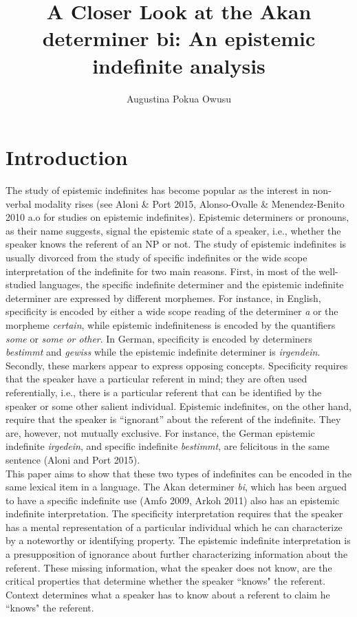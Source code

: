 \documentclass[output=paper,
modfonts
]{langsci/langscibook}
\title{A Closer Look at the Akan determiner bi: An epistemic indefinite analysis}
\author{%
 Augustina Pokua Owusu\affiliation{Rutgers University }
}
\begin{document}
\maketitle

\section{Introduction} 
The study of epistemic indefinites has become popular as the interest in non-verbal modality rises (see Aloni \& Port 2015, Alonso-Ovalle \& Menendez-Benito 2010 a.o for studies on epistemic indefinites). Epistemic determiners or pronouns, as their name suggests, signal the epistemic state of a speaker, i.e., whether the speaker knows the referent of an NP or not. The study of epistemic indefinites is usually divorced from the study of specific indefinites or the wide scope interpretation of the indefinite for two main reasons. First, in most of the well-studied languages, the specific indefinite determiner and the epistemic indefinite determiner are expressed by different morphemes. For instance, in English, specificity is encoded by either a wide scope reading of the determiner \emph{a} or the morpheme \emph{certain}, while epistemic indefiniteness is encoded by the quantifiers \emph{some} or \emph{some or other}. In German, specificity is encoded by determiners \emph{bestimmt} and \emph{gewiss} while the epistemic indefinite determiner is \emph{irgendein}. Secondly, these markers appear to express opposing concepts. Specificity requires that the speaker have a particular referent in mind; they are often used referentially, i.e., there is a particular referent that can be identified by the speaker or some other salient individual. Epistemic indefinites, on the other hand, require that the speaker is ``ignorant'' about the referent of the indefinite. They are, however, not mutually exclusive. For instance, the German epistemic indefinite \emph{irgedein}, and specific indefinite \emph{bestimmt}, are felicitous in the same sentence (Aloni and Port 2015).  \\
This paper aims to show that these two types of indefinites can be encoded in the same lexical item in a language. The Akan determiner \emph{bi}, which has been argued to have a specific indefinite use (Amfo 2009, Arkoh 2011) also has an epistemic indefinite interpretation. The specificity interpretation requires that the speaker has a mental representation of a particular individual which he can characterize by a noteworthy or identifying property. The epistemic indefinite interpretation is a presupposition of ignorance about further characterizing information about the referent. These missing information, what the speaker does not know, are the critical properties that determine whether the speaker ``knows" the referent. Context determines what a speaker has to know about a referent to claim he ``knows" the referent.
\end{document}
